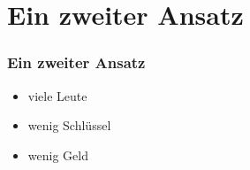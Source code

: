 \section{Ein zweiter Ansatz}
\begin{frame}
	\frametitle{Ein zweiter Ansatz}
	\begin{itemize}
		\item viele Leute
		\item wenig Schlüssel
		\item wenig Geld
	\end{itemize}
\end{frame}



